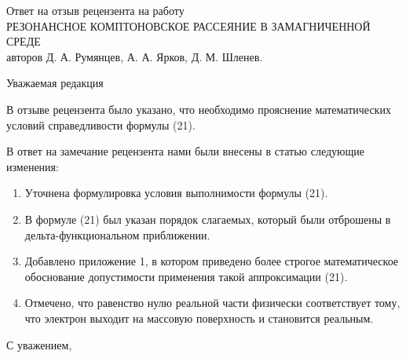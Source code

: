 \documentclass[14pt, russian]{article}
\begin{document}
\begin{center}
Ответ на отзыв рецензента на работу\\
РЕЗОНАНСНОЕ КОМПТОНОВСКОЕ РАССЕЯНИЕ В ЗАМАГНИЧЕННОЙ СРЕДЕ\\
авторов Д. А. Румянцев, А. А. Ярков, Д. М. Шленев.

\vspace{5mm}
Уважаемая редакция
\end{center}

В отзыве рецензента было указано, что необходимо прояснение математических 
условий справедливости формулы (21).

В ответ на замечание рецензента нами были внесены в статью следующие изменения:
\begin{enumerate}
	\item Уточнена формулировка условия выполнимости формулы (21). 
	\item В формуле (21) был указан порядок слагаемых, который были отброшены в 
	дельта-функциональном приближении.
	\item Добавлено приложение 1, в котором приведено более строгое 
	математическое обоснование допустимости применения такой аппроксимации (21).
	\item Отмечено, что равенство нулю реальной части физически соответствует 
	тому, что электрон выходит на массовую поверхность и становится реальным.
\end{enumerate} 

\vspace{5mm}
С уважением,
\end{document}
